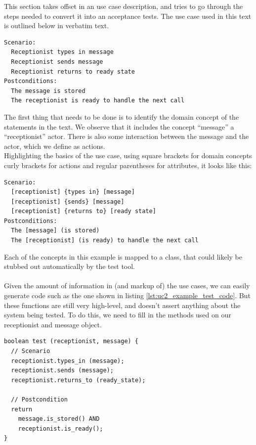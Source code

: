 This section takes offset in an use case description, and tries to go through the steps needed to convert it into an acceptance tests. The use case used in this text is outlined below in verbatim text.
\begin{verbatim}
Scenario:
  Receptionist types in message
  Receptionist sends message
  Receptionist returns to ready state
Postconditions:
  The message is stored
  The receptionist is ready to handle the next call
\end{verbatim} 
The first thing that needs to be done is to identify the domain concept of the statements in the text. We observe that it includes the concept ``message'' a ``receptionist'' actor. There is also some interaction between the message and the actor, which we define as actions.\\
Highlighting the basics of the use case, using square brackets for domain concepts curly brackets for actions and regular parentheses for attributes, it looks like this:
\begin{verbatim}
Scenario:
  [receptionist] {types in} [message]
  [receptionist] {sends} [message]
  [receptionist] {returns to} [ready state]
Postconditions:
  The [message] (is stored)
  The [receptionist] (is ready) to handle the next call
\end{verbatim} 
Each of the concepts in this example is mapped to a class, that could likely be stubbed out automatically by the test tool.\\\\
Given the amount of information in (and markup of) the use cases, we can easily generate code such as the one shown in listing \ref{lst:uc2_example_test_code}. But these functions are still very high-level, and doesn't assert anything about the system being tested. To do this, we need to fill in the methods used on our receptionist and message object.
\begin{lstlisting}[caption=Generated test case,label={lst:uc2_example_test_code}]
boolean test (receptionist, message) {
  // Scenario
  receptionist.types_in (message);
  receptionist.sends (message);
  receptionist.returns_to (ready_state);
  
  // Postcondition
  return
    message.is_stored() AND
    receptionist.is_ready();
}
\end{lstlisting}
